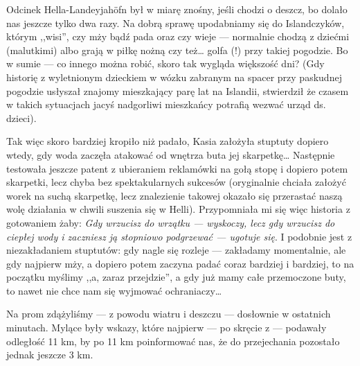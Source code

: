 

Odcinek Hella-Landeyjahöfn był w miarę znośny, jeśli chodzi o deszcz, bo dolało nas jeszcze tylko dwa razy. Na dobrą sprawę upodabniamy się do Islandczyków, którym ,,wisi'', czy mży bądź pada oraz czy wieje --- normalnie chodzą z dziećmi (malutkimi) albo grają w piłkę nożną czy też… golfa (!) przy takiej pogodzie. Bo w sumie --- co innego można robić, skoro tak wygląda większość dni? (Gdy historię z wyletnionym dzieckiem w wózku zabranym na spacer przy paskudnej pogodzie usłyszał znajomy mieszkający parę lat na Islandii, stwierdził że czasem w takich sytuacjach jacyś nadgorliwi mieszkańcy potrafią wezwać urząd ds. dzieci).

Tak więc skoro bardziej kropiło niż padało, Kasia założyła stuptuty dopiero wtedy, gdy woda zaczęła atakować od wnętrza buta jej skarpetkę… Następnie testowała jeszcze patent z ubieraniem reklamówki na gołą stopę i dopiero potem skarpetki, lecz chyba bez spektakularnych sukcesów (oryginalnie chciała założyć worek na suchą skarpetkę, lecz znalezienie takowej okazało się przerastać naszą wolę działania w chwili suszenia się w Helli). Przypomniała mi się więc historia z gotowaniem żaby: \emph{Gdy wrzucisz do wrzątku --- wyskoczy, lecz gdy wrzucisz do ciepłej wody i zaczniesz ją stopniowo podgrzewać --- ugotuje się}. I podobnie jest z niezakładaniem stuptutów: gdy nagle się rozleje --- zakładamy momentalnie, ale gdy najpierw mży, a dopiero potem zaczyna padać coraz bardziej i bardziej, to na początku myślimy ,,a, zaraz przejdzie'', a gdy już mamy całe przemoczone buty, to nawet nie chce nam się wyjmować ochraniaczy…

Na prom zdążyliśmy --- z powodu wiatru i deszczu --- dosłownie w ostatnich minutach. Mylące były wskazy, które najpierw --- po skręcie z  --- podawały odległość 11 km, by po 11 km poinformować nas, że do przejechania pozostało jednak jeszcze 3 km.


